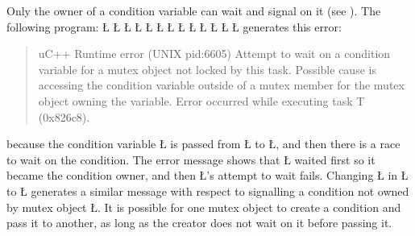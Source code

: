 \documentclass[openright,twoside]{report}
\begin{document}
Only the owner of a condition variable can wait and signal on it (see ).
The following program:
\LGinlinefalse\LGbegin\lgrinde
\L{}
\L{\LB{}}
\L{\LB{}}
\L{\LB{}}
\L{\LB{}}
\L{}
\L{\LB{}}
\L{\LB{\};}}
\endlgrinde\LGend
\LGinlinefalse\LGbegin\lgrinde
\L{}
\L{\LB{}}
\L{\LB{}}
\L{\LB{}}
\L{\LB{\}}}
\endlgrinde\LGend
generates this error:
\begin{quote}
\BGfont
uC++ Runtime error (UNIX pid:6605) Attempt to wait on a condition variable for a mutex object not locked by this task.
Possible cause is accessing the condition variable outside of a mutex member for the mutex object owning the variable.
Error occurred while executing task T (0x826c8).
\end{quote}
because the condition variable \LGinlinetrue\LGbegin\lgrinde\L{}\endlgrinde\LGend{} is passed from \LGinlinetrue\LGbegin\lgrinde\L{}\endlgrinde\LGend{} to \LGinlinetrue\LGbegin\lgrinde\L{}\endlgrinde\LGend{}, and then there is a race to wait on the condition.
The error message shows that \LGinlinetrue\LGbegin\lgrinde\L{}\endlgrinde\LGend{} waited first so it became the condition owner, and then \LGinlinetrue\LGbegin\lgrinde\L{}\endlgrinde\LGend{}'s attempt to wait fails. 
Changing \LGinlinetrue\LGbegin\lgrinde\L{}\endlgrinde\LGend{} in \LGinlinetrue\LGbegin\lgrinde\L{}\endlgrinde\LGend{} to \LGinlinetrue\LGbegin\lgrinde\L{}\endlgrinde\LGend{} generates a similar message with respect to signalling a condition not owned by mutex object \LGinlinetrue\LGbegin\lgrinde\L{}\endlgrinde\LGend{}.
It is possible for one mutex object to create a condition and pass it to another, as long as the creator does not wait on it before passing it.
\end{document}
